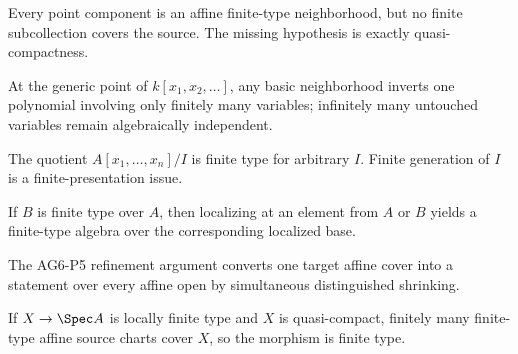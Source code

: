 \begin{example}\label{ex:vi26-a09}
Every point component is an affine finite-type neighborhood, but no finite subcollection covers the source.  The missing hypothesis is exactly quasi-compactness.
\end{example}

\begin{example}\label{ex:vi26-a10}
At the generic point of $k[x_1,x_2,\ldots]$, any basic neighborhood inverts one polynomial involving only finitely many variables; infinitely many untouched variables remain algebraically independent.
\end{example}

\begin{example}\label{ex:vi26-a11}
The quotient $A[x_1,\dots,x_n]/I$ is finite type for arbitrary $I$.  Finite generation of $I$ is a finite-presentation issue.
\end{example}

\begin{example}\label{ex:vi26-a12}
If $B$ is finite type over $A$, then localizing at an element from $A$ or $B$ yields a finite-type algebra over the corresponding localized base.
\end{example}

\begin{example}\label{ex:vi26-a13}
The AG6-P5 refinement argument converts one target affine cover into a statement over every affine open by simultaneous distinguished shrinking.
\end{example}

\begin{example}\label{ex:vi26-a14}
If $X\to\Spec A$ is locally finite type and $X$ is quasi-compact, finitely many finite-type affine source charts cover $X$, so the morphism is finite type.
\end{example}